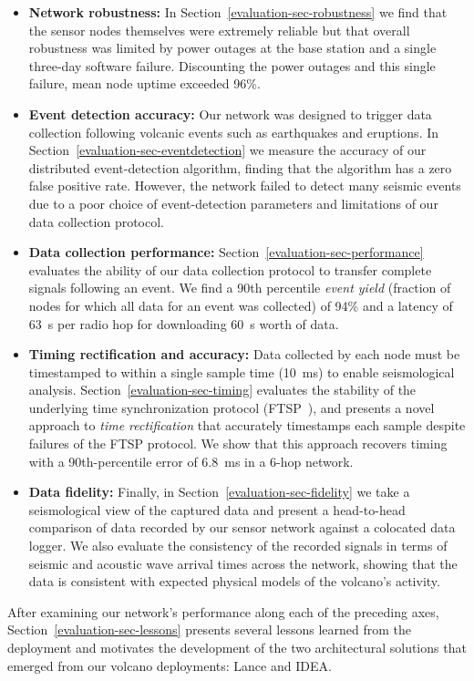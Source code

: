 \begin{itemize}

\item \textbf{Network robustness:} In Section~\ref{evaluation-sec-robustness}
we find that the sensor nodes themselves were extremely reliable but that
overall robustness was limited by power outages at the base station and a
single three-day software failure. Discounting the power outages and this
single failure, mean node uptime exceeded 96\%.

\item \textbf{Event detection accuracy:} Our network was designed to trigger
data collection following volcanic events such as earthquakes and eruptions.
In Section~\ref{evaluation-sec-eventdetection} we measure the accuracy of our
distributed event-detection algorithm, finding that the algorithm has a zero
false positive rate. However, the network failed to detect many seismic
events due to a poor choice of event-detection parameters and limitations of
our data collection protocol.

\item \textbf{Data collection performance:}
Section~\ref{evaluation-sec-performance} evaluates the ability of our data
collection protocol to transfer complete signals following an event. We find
a 90th percentile \textit{event yield} (fraction of nodes for which all data
for an event was collected) of 94\% and a latency of 63~s per radio hop for
downloading 60~s worth of data.

\item \textbf{Timing rectification and accuracy:} Data collected by each node
must be timestamped to within a single sample time (10~ms) to enable
seismological analysis. Section~\ref{evaluation-sec-timing} evaluates the
stability of the underlying time synchronization protocol (FTSP~\cite{ftsp}),
and presents a novel approach to \textit{time rectification} that accurately
timestamps each sample despite failures of the FTSP protocol. We show that
this approach recovers timing with a 90th-percentile error of 6.8~ms in a
6-hop network.

\item \textbf{Data fidelity:} Finally, in
Section~\ref{evaluation-sec-fidelity} we take a seismological view of the
captured data and present a head-to-head comparison of data recorded by our
sensor network against a colocated data logger. We also evaluate the
consistency of the recorded signals in terms of seismic and acoustic wave
arrival times across the network, showing that the data is consistent with
expected physical models of the volcano's activity.

\end{itemize}

After examining our network's performance along each of the preceding axes,
Section~\ref{evaluation-sec-lessons} presents several lessons learned from
the deployment and motivates the development of the two architectural
solutions that emerged from our volcano deployments: Lance and IDEA.
